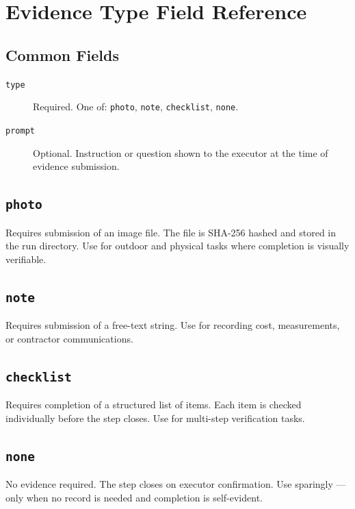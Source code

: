 \section{Evidence Type Field Reference}
\label{sec:ref-evidence-fields}

\subsection{Common Fields}

\begin{description}
  \item[\texttt{type}] Required. One of: \texttt{photo}, \texttt{note},
        \texttt{checklist}, \texttt{none}.
  \item[\texttt{prompt}] Optional. Instruction or question shown to the executor at the
        time of evidence submission.
\end{description}

\subsection{\texttt{photo}}

Requires submission of an image file. The file is SHA-256 hashed and stored in the run
directory. Use for outdoor and physical tasks where completion is visually verifiable.

\subsection{\texttt{note}}

Requires submission of a free-text string. Use for recording cost, measurements, or
contractor communications.

\subsection{\texttt{checklist}}

Requires completion of a structured list of items. Each item is checked individually before
the step closes. Use for multi-step verification tasks.

\subsection{\texttt{none}}

No evidence required. The step closes on executor confirmation. Use sparingly --- only when
no record is needed and completion is self-evident.

